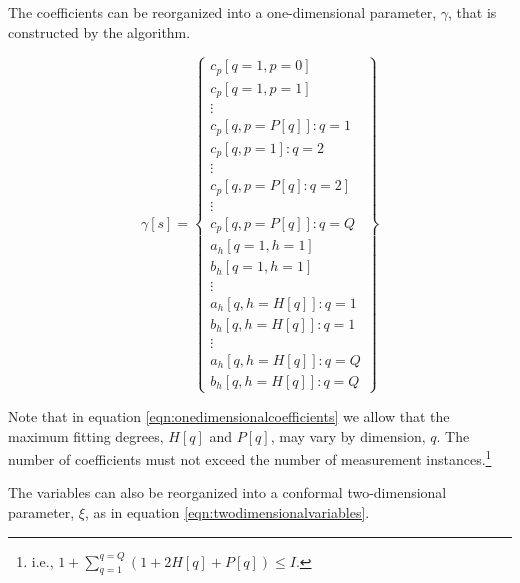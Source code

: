 \documentclass{article}
\begin{document}
\par{The coefficients can be reorganized into a one-dimensional parameter, $\gamma$, that is constructed by the algorithm.}

\begin{equation}
\label{eqn:onedimensionalcoefficients}
\gamma\left[s\right] = \left\{\begin{array}{c}
	c_p\left[q = 1, p = 0\right]\\
	c_p\left[q = 1, p = 1\right]\\
	\vdots\\
	c_p\left[q, p = P[q]\right] : q = 1\\
	c_p\left[q, p = 1\right] : q = 2\\
	\vdots\\
	c_p\left[q, p = P\left[q\right] : q = 2\right]\\
	\vdots\\
	c_p\left[q, p = P\left[q\right]\right] : q = Q\\
	a_h\left[q = 1, h = 1\right]\\
	b_h\left[q = 1, h = 1\right]\\
	\vdots\\
	a_h\left[q, h = H\left[q\right]\right] : q = 1\\
	b_h\left[q, h = H\left[q\right]\right] : q = 1\\
	\vdots\\
	a_h\left[q, h = H\left[q\right]\right] : q = Q\\
	b_h\left[q, h = H\left[q\right]\right] : q = Q
\end{array}\right\}
\end{equation}

\par{Note that in equation \eqref{eqn:onedimensionalcoefficients} we allow that the maximum fitting degrees, $H[q]$ and $P[q]$, may vary by dimension, $q$. The number of coefficients must not exceed the number of measurement instances.\footnote{i.e., $1 + \sum\limits_{q = 1}^{q = Q}\left(1 + 2H\left[q\right] + P\left[q\right]\right) \le I$.}}

\par{The variables can also be reorganized into a conformal two-dimensional parameter, $\xi$, as in equation \eqref{eqn:twodimensionalvariables}.}
\end{document}
